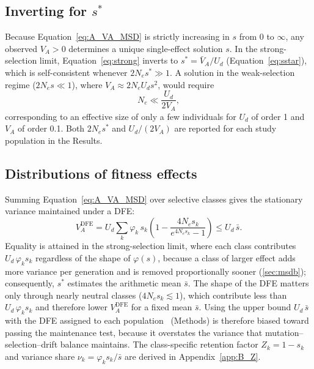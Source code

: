 \documentclass{article}
\begin{document}
\subsection{Inverting for \texorpdfstring{$s^*$}{s*}}\label{app:A_inversion}
Because Equation~\eqref{eq:A_VA_MSD} is strictly increasing in $s$ from $0$ to $\infty$, any observed $V_A > 0$ determines a unique single-effect solution $s$. In the strong-selection limit, Equation~\eqref{eq:strong} inverts to $s^* = \bar{V}_A / U_d$ (Equation~\eqref{eq:sstar}), which is self-consistent whenever $2N_e s^* \gg 1$. A solution in the weak-selection regime ($2N_e s \ll 1$), where $V_A \approx 2N_e U_d s^2$, would require
\begin{equation}
    N_e \ll \frac{U_d}{2V_A},
\end{equation}
corresponding to an effective size of only a few individuals for $U_d$ of order 1 and $V_A$ of order 0.1. Both $2N_e s^*$ and $U_d/(2V_A)$ are reported for each study population in the Results.

\subsection{Distributions of fitness effects}\label{app:A_dfe}
Summing Equation~\eqref{eq:A_VA_MSD} over selective classes gives the stationary variance maintained under a DFE:
\begin{equation}
    V_A^{\text{DFE}} = U_d \sum_k \varphi_k\, s_k\left(1 - \frac{4N_e s_k}{e^{4N_e s_k} - 1}\right) \le U_d\,\bar{s}.
\label{eq:VA_forward}
\end{equation}
Equality is attained in the strong-selection limit, where each class contributes $U_d\,\varphi_k s_k$ regardless of the shape of $\varphi(s)$, because a class of larger effect adds more variance per generation and is removed proportionally sooner (\autoref{sec:msdb}); consequently, $s^*$ estimates the arithmetic mean $\bar{s}$. The shape of the DFE matters only through nearly neutral classes ($4N_e s_k \lesssim 1$), which contribute less than $U_d\,\varphi_k s_k$ and therefore lower $V_A^{\text{DFE}}$ for a fixed mean $\bar{s}$. Using the upper bound $U_d\,\bar{s}$ with the DFE assigned to each population~\cite{lin2026} (Methods) is therefore biased toward passing the maintenance test, because it overstates the variance that mutation--selection--drift balance maintains. The class-specific retention factor $Z_k = 1 - s_k$ and variance share $\nu_k = \varphi_k s_k / \bar{s}$ are derived in Appendix~\ref{app:B_Z}.
\end{document}
